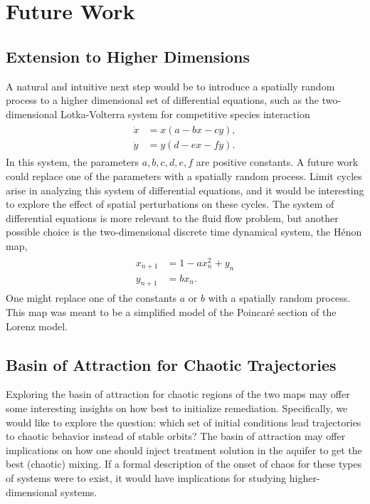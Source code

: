\section{Future Work}
\subsection{Extension to Higher Dimensions}
A natural and intuitive next step would be to introduce a spatially
random process to a higher dimensional set of differential equations, such as the
two-dimensional Lotka-Volterra
system for competitive species interaction
\begin{align}
\begin{split}
\dot{x} &= x(a-bx-cy),\\
\dot{y} &= y(d-ex-fy).
\end{split}
\end{align}
In this system, the parameters $a,b,c,d,e,f$ are positive
constants. A
future work could replace one of the parameters with a spatially
random process. Limit cycles arise in analyzing this system of
differential equations, and it would be interesting to explore the
effect of spatial perturbations on these cycles. The system of differential equations is more relevant to
the fluid flow problem, but another possible
choice is the two-dimensional discrete time dynamical system, the H\'{e}non map,
\begin{align}
\begin{split}
x_{n+1}&=1-ax_n^2+y_n\\
y_{n+1}&=bx_n.
\end{split}
\end{align}
One might replace one of the constants $a$ or $b$ with a spatially random
process. This map was meant to be a simplified model of the
Poincar\'{e} section of the Lorenz model. 
\subsection{Basin of Attraction for Chaotic Trajectories}
Exploring the basin of attraction for chaotic
regions of the two maps may offer some interesting insights on how
best to initialize remediation. Specifically, we would like to explore the
question: which set of initial conditions lead trajectories to chaotic
behavior instead of stable orbits? The basin of attraction may offer
implications on how one should inject treatment solution in the
aquifer to get the best (chaotic) mixing. If a formal description of
the onset of chaos for these types of systems were to exist, it would
have implications for studying higher-dimensional systems.
